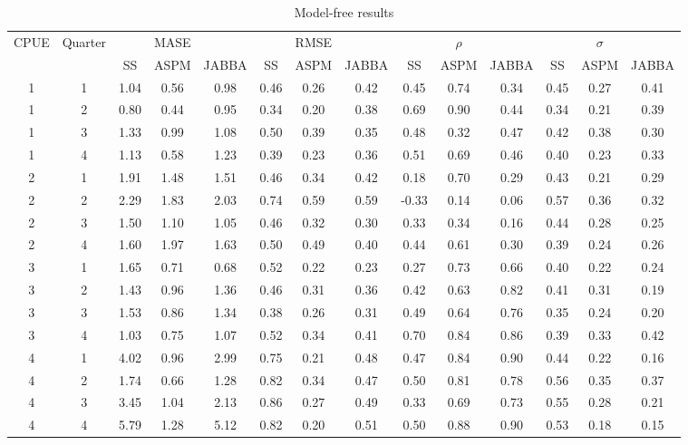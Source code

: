 \documentclass[12pt,halfline,a4paper,nonumbib]{ouparticle}
\begin{document}
\begin{table}[ht]
\caption{Model-free results}
\centering
\label{tab:mase}
\tiny
\begin{tabular}{|cc|ccc|ccc|ccc|ccc|}
  \hline
 CPUE & Quarter &  & MASE &  &  & RMSE & &  & $\rho$ &  & & $\sigma$ &  \\
      &         & SS & ASPM & JABBA & SS & ASPM & JABBA & SS & ASPM & JABBA & SS & ASPM & JABBA \\
\hline\hline
  1 & 1 & 1.04 & 0.56 & 0.98 & 0.46 & 0.26 & 0.42 & 0.45 & 0.74 & 0.34 & 0.45 & 0.27 & 0.41 \\ 
  1 & 2 & 0.80 & 0.44 & 0.95 & 0.34 & 0.20 & 0.38 & 0.69 & 0.90 & 0.44 & 0.34 & 0.21 & 0.39 \\ 
  1 & 3 & 1.33 & 0.99 & 1.08 & 0.50 & 0.39 & 0.35 & 0.48 & 0.32 & 0.47 & 0.42 & 0.38 & 0.30 \\ 
  1 & 4 & 1.13 & 0.58 & 1.23 & 0.39 & 0.23 & 0.36 & 0.51 & 0.69 & 0.46 & 0.40 & 0.23 & 0.33 \\ 
  2 & 1 & 1.91 & 1.48 & 1.51 & 0.46 & 0.34 & 0.42 & 0.18 & 0.70 & 0.29 & 0.43 & 0.21 & 0.29 \\ 
  2 & 2 & 2.29 & 1.83 & 2.03 & 0.74 & 0.59 & 0.59 & -0.33 & 0.14 & 0.06 & 0.57 & 0.36 & 0.32 \\ 
  2 & 3 & 1.50 & 1.10 & 1.05 & 0.46 & 0.32 & 0.30 & 0.33 & 0.34 & 0.16 & 0.44 & 0.28 & 0.25 \\ 
  2 & 4 & 1.60 & 1.97 & 1.63 & 0.50 & 0.49 & 0.40 & 0.44 & 0.61 & 0.30 & 0.39 & 0.24 & 0.26 \\ 
  3 & 1 & 1.65 & 0.71 & 0.68 & 0.52 & 0.22 & 0.23 & 0.27 & 0.73 & 0.66 & 0.40 & 0.22 & 0.24 \\ 
  3 & 2 & 1.43 & 0.96 & 1.36 & 0.46 & 0.31 & 0.36 & 0.42 & 0.63 & 0.82 & 0.41 & 0.31 & 0.19 \\ 
  3 & 3 & 1.53 & 0.86 & 1.34 & 0.38 & 0.26 & 0.31 & 0.49 & 0.64 & 0.76 & 0.35 & 0.24 & 0.20 \\ 
  3 & 4 & 1.03 & 0.75 & 1.07 & 0.52 & 0.34 & 0.41 & 0.70 & 0.84 & 0.86 & 0.39 & 0.33 & 0.42 \\ 
  4 & 1 & 4.02 & 0.96 & 2.99 & 0.75 & 0.21 & 0.48 & 0.47 & 0.84 & 0.90 & 0.44 & 0.22 & 0.16 \\ 
  4 & 2 & 1.74 & 0.66 & 1.28 & 0.82 & 0.34 & 0.47 & 0.50 & 0.81 & 0.78 & 0.56 & 0.35 & 0.37 \\ 
  4 & 3 & 3.45 & 1.04 & 2.13 & 0.86 & 0.27 & 0.49 & 0.33 & 0.69 & 0.73 & 0.55 & 0.28 & 0.21 \\ 
  4 & 4 & 5.79 & 1.28 & 5.12 & 0.82 & 0.20 & 0.51 & 0.50 & 0.88 & 0.90 & 0.53 & 0.18 & 0.15 \\ 
 \hline
\end{tabular}
\end{table}
\end{document}
